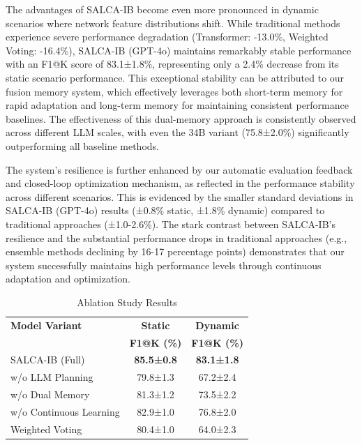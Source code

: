 \documentclass[conference]{IEEEtran}
\begin{document}
The advantages of SALCA-IB become even more pronounced in dynamic scenarios where network feature distributions shift. While traditional methods experience severe performance degradation (Transformer: -13.0\%, Weighted Voting: -16.4\%), SALCA-IB (GPT-4o) maintains remarkably stable performance with an F1@K score of 83.1±1.8\%, representing only a 2.4\% decrease from its static scenario performance. This exceptional stability can be attributed to our fusion memory system, which effectively leverages both short-term memory for rapid adaptation and long-term memory for maintaining consistent performance baselines. The effectiveness of this dual-memory approach is consistently observed across different LLM scales, with even the 34B variant (75.8±2.0\%) significantly outperforming all baseline methods.

The system's resilience is further enhanced by our automatic evaluation feedback and closed-loop optimization mechanism, as reflected in the performance stability across different scenarios. This is evidenced by the smaller standard deviations in SALCA-IB (GPT-4o) results (±0.8\% static, ±1.8\% dynamic) compared to traditional approaches (±1.0-2.6\%). The stark contrast between SALCA-IB's resilience and the substantial performance drops in traditional approaches (e.g., ensemble methods declining by 16-17 percentage points) demonstrates that our system successfully maintains high performance levels through continuous adaptation and optimization.

\begin{table}[!t]
\caption{Ablation Study Results}
\label{tab:ablation}
\renewcommand{\arraystretch}{1.2}
\begin{center}
\begin{tabular}{l|cc}
\hline\hline
\textbf{Model Variant} & \textbf{Static} & \textbf{Dynamic} \\
& \textbf{F1@K (\%)} & \textbf{F1@K (\%)} \\
\hline
SALCA-IB (Full) & \textbf{85.5±0.8} & \textbf{83.1±1.8} \\
\hline
w/o LLM Planning & 79.8±1.3 & 67.2±2.4 \\
w/o Dual Memory & 81.3±1.2 & 73.5±2.2 \\
w/o Continuous Learning & 82.9±1.0 & 76.8±2.0 \\
\hline
Weighted Voting & 80.4±1.0 & 64.0±2.3 \\
\hline\hline
\end{tabular}
\end{center}
\end{table}
\end{document}
